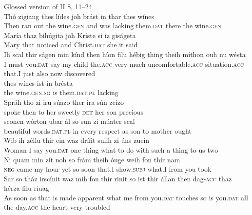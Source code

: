 \ea%
    \label{ex:7:10}
Glossed version of II 8, 11--24\\

\gll Thó     zigiang   {thes lídes}     joh  brást    in       thar thes wínes\\
Then  {ran out}   {the wine.\textsc{gen}}   and  {was lacking}   them.\textsc{dat}   there the wine.\textsc{gen}\\

\gll María  thaz  bihúgita  joh Kríste      si     iz    giságeta   \\ 
Mary   that  noticed   and Christ.\textsc{dat}  she  it   said \\

\gll Ih   scal    thir   ságen  min  kínd then    híon filu  hébig        thing      theih   míthon   ouh  nu    wésta\\
I   must  you.\textsc{dat}     say     my  child the.\textsc{acc}  very   much uncomfortable.\textsc{acc}   situation.\textsc{acc}   that.I   just    also  now   discovered\\

\gll thes  wínes     ist     in       brésta  \\
the wine.\textsc{gen.sg}  is   them.\textsc{dat.pl}  lacking  \\

\gll Spráh tho   zi iru súazo    ther  ira  sún  zeizo\\
spoke then  to her sweetly  \textsc{det}  her  son  precious\\

\gll sconen wórton     {ubar ál}       so sun   zi múater   scal\\
beautiful words.\textsc{dat.pl}  {in every respect}  as son  to mother  ought\\

\gll Wib    ih   zéllu thir           ein      waz      drífit     sulih     zi úns  zuein\\
      Woman  I  say    you.\textsc{dat}   {one thing}   what  {to do with}  {such a thing}  to us   two\\

\gll Ni  quam  min zít  noh  so frám   theih   óuge         weih   fon thír    nam\\
\textsc{neg}   came   my hour   yet  so soon  that.I  show.\textsc{subj}   what.I  from you   took\\

\gll Sar so    tház  irscínit       waz    mih  fon    thír    rinit    so   ist   thir állan then dag-\textsc{acc}  thaz hérza  filu ríuag \\
{As soon} as   that  {is made apparent}  what  me  from   you.\textsc{dat}  touches   so  is  you.\textsc{dat} all the day.\textsc{acc}  the heart     very troubled \\

